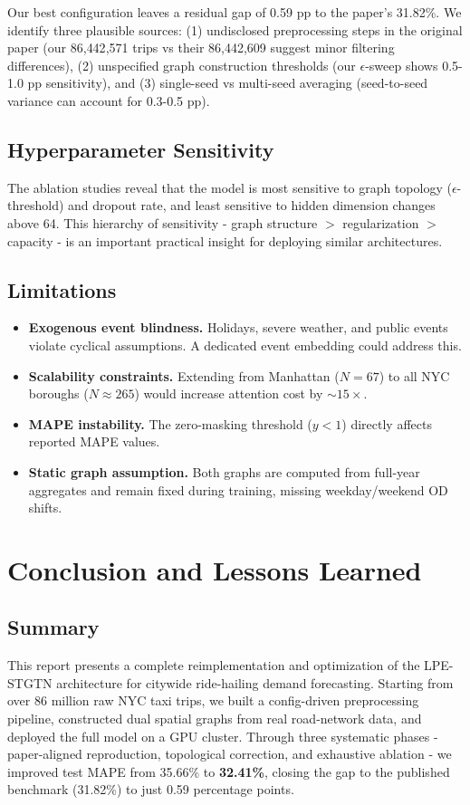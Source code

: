 \documentclass{rapportECL}
\begin{document}
Our best configuration leaves a residual gap of 0.59 pp to the paper's 31.82\%. We identify three plausible sources: (1) undisclosed preprocessing steps in the original paper (our 86{,}442{,}571 trips vs their 86{,}442{,}609 suggest minor filtering differences), (2) unspecified graph construction thresholds (our $\epsilon$-sweep shows 0.5-1.0 pp sensitivity), and (3) single-seed vs multi-seed averaging (seed-to-seed variance can account for 0.3-0.5 pp).

\subsection{Hyperparameter Sensitivity}
The ablation studies reveal that the model is most sensitive to graph topology ($\epsilon$-threshold) and dropout rate, and least sensitive to hidden dimension changes above 64. This hierarchy of sensitivity - graph structure $>$ regularization $>$ capacity - is an important practical insight for deploying similar architectures.

\subsection{Limitations}
\begin{itemize}[leftmargin=*]
    \item \textbf{Exogenous event blindness.} Holidays, severe weather, and public events violate cyclical assumptions. A dedicated event embedding could address this.
    \item \textbf{Scalability constraints.} Extending from Manhattan ($N{=}67$) to all NYC boroughs ($N{\approx}265$) would increase attention cost by ${\sim}15{\times}$.
    \item \textbf{MAPE instability.} The zero-masking threshold ($y < 1$) directly affects reported MAPE values.
    \item \textbf{Static graph assumption.} Both graphs are computed from full-year aggregates and remain fixed during training, missing weekday/weekend OD shifts.
\end{itemize}

\section{Conclusion and Lessons Learned}

\subsection{Summary}
This report presents a complete reimplementation and optimization of the LPE-STGTN architecture for citywide ride-hailing demand forecasting. Starting from over 86 million raw NYC taxi trips, we built a config-driven preprocessing pipeline, constructed dual spatial graphs from real road-network data, and deployed the full model on a GPU cluster. Through three systematic phases - paper-aligned reproduction, topological correction, and exhaustive ablation - we improved test MAPE from 35.66\% to \textbf{32.41\%}, closing the gap to the published benchmark (31.82\%) to just 0.59 percentage points.
\end{document}

